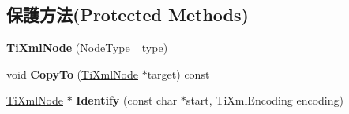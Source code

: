 \subsection*{保護方法(Protected Methods)}
\begin{DoxyCompactItemize}
\item 
{\bfseries Ti\+Xml\+Node} (\hyperlink{class_ti_xml_node_a836eded4920ab9e9ef28496f48cd95a2}{Node\+Type} \+\_\+type)\hypertarget{class_ti_xml_node_a3f46721695868667113c7487ff123f20}{}\label{class_ti_xml_node_a3f46721695868667113c7487ff123f20}

\item 
void {\bfseries Copy\+To} (\hyperlink{class_ti_xml_node}{Ti\+Xml\+Node} $\ast$target) const \hypertarget{class_ti_xml_node_ab6056978923ad8350fb5164af32d8038}{}\label{class_ti_xml_node_ab6056978923ad8350fb5164af32d8038}

\item 
\hyperlink{class_ti_xml_node}{Ti\+Xml\+Node} $\ast$ {\bfseries Identify} (const char $\ast$start, Ti\+Xml\+Encoding encoding)\hypertarget{class_ti_xml_node_ac1e3a8e7578be463b04617786120c2bb}{}\label{class_ti_xml_node_ac1e3a8e7578be463b04617786120c2bb}

\end{DoxyCompactItemize}
